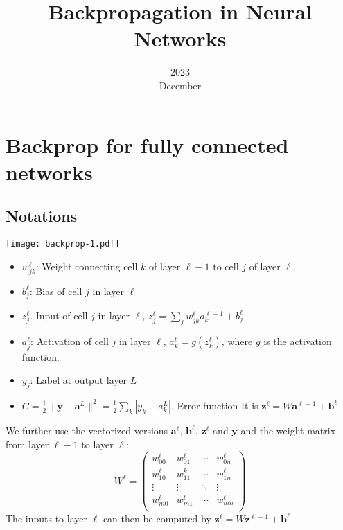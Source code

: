 \documentclass[a4paper,10pt]{article}
\title{Backpropagation in Neural Networks}
\date{2023\\ December}
\newcommand{\vc}[1]{\boldsymbol{#1}}
\begin{document}
\maketitle

\section{Backprop for fully connected networks}

\def\inn{\text{in}}

\subsection{Notations}

\texttt{[image: backprop-1.pdf]}

\begin{itemize}
    \item $w_{jk}^\ell$: Weight connecting cell $k$ of layer $\ell -1$ to cell $j$ of layer $\ell$.
    \item $b_j^\ell$: Bias of cell $j$ in layer $\ell$
    \item $z_j^\ell$. Input of cell $j$ in layer $\ell$, $z_j^\ell = \sum_j w_{jk}^\ell a_k^{\ell-1} + b_j^\ell$
    \item $a_j^\ell$: Activation of cell $j$ in layer $\ell$, $a_k^{\ell} = g(z_k^\ell)$, where $g$ is the activation function.
    \item $y_j$: Label at output layer $L$
    \item $C=\frac12 \| \vc{y} - \vc{a}^L \|^2 = \frac12 \sum_{k} | y_k - a_k^L |$. Error function
          It is $\vc{z}^{\ell} = W\vc{a}^{\ell-1} + \vc{b}^\ell$
\end{itemize}

We further use the vectorized versions $\vc{a}^\ell$, $\vc{b}^\ell$,
$\vc{z}^\ell$ and $\vc{y}$ and the weight matrix from layer $\ell-1$ to layer
$\ell$:
\[
    W^\ell =
    \begin{pmatrix}
        w_{00}^\ell & w_{01}^\ell & \cdots & w_{0n}^\ell \\
        w_{10}^\ell & w_{11}^k    & \cdots & w_{1n}^\ell \\
        \vdots      & \vdots      & \ddots & \vdots      \\
        w_{m0}^\ell & w_{m1}^\ell & \cdots & w_{mn}^\ell \\
    \end{pmatrix}
\]
The inputs to layer $\ell$ can then be computed by $\vc{z}^\ell =
    W\vc{z}^{\ell-1}+\vc{b}^\ell$
\end{document}
